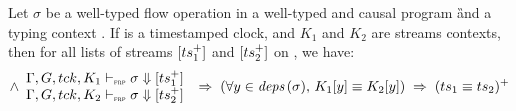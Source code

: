 \begin{lemma}
    \label{lem:semantics:grfrp:theorems:determinism}
    Let $\sigma$ be a well-typed flow operation in a well-typed and causal program \G and a typing
    context \tyCtx.
    If \tck is a timestamped clock, and $K_1$ and $K_2$ are streams contexts, then for all lists of
    streams $[ts_1^+]$ and $[ts_2^+]$ on \tck, we have:
    \begin{equation*}
        \wedge \begin{array}{l}
            \Gamma, G, tck, K_1 \vdash_{\textnormal{\tiny\textsc{frp}}} \sigma \Downarrow [ts_1^+] \\
            \Gamma, G, tck, K_2 \vdash_{\textnormal{\tiny\textsc{frp}}} \sigma \Downarrow [ts_2^+]
        \end{array}
        \; \Rightarrow \;
        (\forall y \in {\ensuremath{\textit{deps}\left(\sigma\right)}}, \, K_1[y] \equiv K_2[y])
        \; \Rightarrow \;
        (ts_1 \equiv ts_2)^+
    \end{equation*}
\end{lemma}
